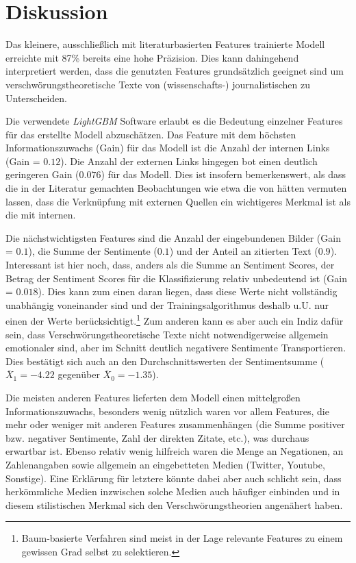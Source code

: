 \section{Diskussion}

Das kleinere, ausschließlich mit literaturbasierten Features trainierte Modell erreichte mit 87\% bereits eine hohe Präzision.
Dies kann dahingehend interpretiert werden, dass die genutzten Features grundsätzlich geeignet sind um verschwörungstheoretische Texte von (wissenschafts-) journalistischen zu Unterscheiden.

Die verwendete \textit{LightGBM} Software erlaubt es die Bedeutung einzelner Features für das erstellte Modell abzuschätzen.
Das Feature mit dem höchsten Informationszuwachs (Gain) für das Modell ist die Anzahl der internen Links (Gain = $0.12$).
Die Anzahl der externen Links hingegen bot einen deutlich geringeren Gain ($0.076$) für das Modell.
Dies ist insofern bemerkenswert, als dass die in der Literatur gemachten Beobachtungen wie etwa die von \textcite[10]{soukup_2008} hätten vermuten lassen, dass die Verknüpfung mit externen Quellen ein wichtigeres Merkmal ist als die mit internen.

Die nächstwichtigsten Features sind die Anzahl der eingebundenen Bilder (Gain = $0.1$), die Summe der Sentimente ($0.1$) und der Anteil an zitierten Text ($0.9$).
Interessant ist hier noch, dass, anders als die Summe an Sentiment Scores, der Betrag der Sentiment Scores für die Klassifizierung relativ unbedeutend ist (Gain = $0.018$).
Dies kann zum einen daran liegen, dass diese Werte nicht vollständig unabhängig voneinander sind und der Trainingsalgorithmus deshalb u.U. nur einen der Werte berücksichtigt.\footnote{Baum-basierte Verfahren sind meist in der Lage relevante Features zu einem gewissen Grad selbst zu selektieren.}
Zum anderen kann es aber auch ein Indiz dafür sein, dass Verschwörungstheoretische Texte nicht notwendigerweise allgemein emotionaler sind, aber im Schnitt deutlich negativere Sentimente Transportieren.
Dies bestätigt sich auch an den Durchschnittswerten der Sentimentsumme ($\overline{X}_1 = -4.22$ gegenüber $\overline{X}_0 = -1.35$).

Die meisten anderen Features lieferten dem Modell einen mittelgroßen Informationszuwachs, besonders wenig nützlich waren vor allem Features, die mehr oder weniger mit anderen Features zusammenhängen (die Summe positiver bzw. negativer Sentimente, Zahl der direkten Zitate, etc.), was durchaus erwartbar ist.
Ebenso relativ wenig hilfreich waren die Menge an Negationen, an Zahlenangaben sowie allgemein an eingebetteten Medien (Twitter, Youtube, Sonstige).
Eine Erklärung für letztere könnte dabei aber auch schlicht sein, dass herkömmliche Medien inzwischen solche Medien auch häufiger einbinden und in diesem stilistischen Merkmal sich den Verschwörungstheorien angenähert haben.

